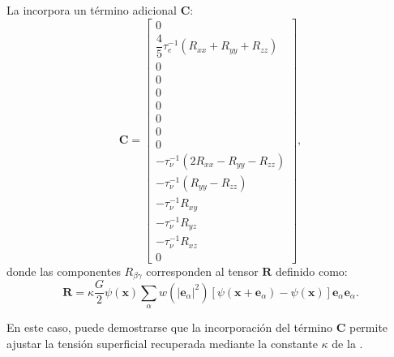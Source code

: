 La  incorpora un t\'ermino adicional $\bm{C}$:
\begin{equation}
 \bm{C} = 
 \left[ 
 	\begin{array}{c} 
 		0	\\
 		\dfrac{4}{5} \tau_{e}^{-1}(R_{xx} + R_{yy} + R_{zz}) \\
 		0 \\
 		0 \\
 		0 \\
 		0 \\
 		0 \\
 		0 \\
 		0 \\ 		
		-\tau_{\nu}^{-1}(2R_{xx} - R_{yy} - R_{zz}) \\
		-\tau_{\nu}^{-1}(R_{yy} - R_{zz}) \\
		-\tau_{\nu}^{-1}R_{xy} \\
		-\tau_{\nu}^{-1}R_{yz} \\
		-\tau_{\nu}^{-1}R_{xz} \\
		0
 	\end{array} 
 \right],
 \label{eq:c_xu}
\end{equation}
donde las componentes $R_{\beta\gamma}$ corresponden al tensor $\bm{R}$ definido como:
\begin{equation}
 \bm{R} = \kappa \dfrac{G}{2} \psi(\bm{x}) \sum_{\alpha} w(|\bm{e}_{\alpha}|^2) \left[ \psi(\bm{x}+\bm{e}_{\alpha}) - \psi(\bm{x}) \right] \bm{e}_{\alpha}\bm{e}_{\alpha}.
	\label{eq:R_xu}
\end{equation}

En este caso, puede demostrarse que la incorporaci\'on del t\'ermino $\bm{C}$ permite  ajustar la tensi\'on superficial recuperada mediante la constante $\kappa$ de la .


